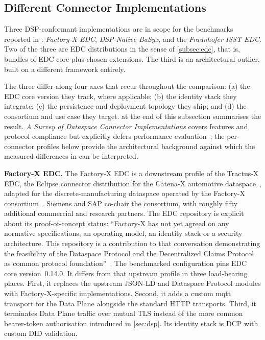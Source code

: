 \subsection{Different Connector Implementations}\label{subsec:different-connectors}

Three DSP-conformant implementations are in scope for the benchmarks reported in : \emph{Factory-X EDC}, \emph{DSP-Native BaSyx}, and the \emph{Fraunhofer ISST EDC}. Two of the three are EDC distributions in the sense of \cref{subsec:edc}, that is, bundles of EDC core plus chosen extensions. The third is an architectural outlier, built on a different framework entirely.

The three differ along four axes that recur throughout the comparison: (a) the EDC core version they track, where applicable; (b) the identity stack they integrate; (c) the persistence and deployment topology they ship; and (d) the consortium and use case they target.  at the end of this subsection summarises the result. \emph{A Survey of Dataspace Connector Implementations} covers features and protocol compliance but explicitly defers performance evaluation~\citep{dam2024surveydataspaceconnectorimplementations}; the per-connector profiles below provide the architectural background against which the measured differences in  can be interpreted.

\textbf{Factory-X EDC.} The Factory-X EDC is a downstream profile of the Tractus-X EDC, the Eclipse connector distribution for the Catena-X automotive dataspace~\citep{tractusxEdc}, adapted for the discrete-manufacturing dataspace operated by the Factory-X consortium~\citep{factoryxEdc, factoryxConsortium}. Siemens and SAP co-chair the consortium, with roughly fifty additional commercial and research partners. The EDC repository is explicit about its proof-of-concept status: ``Factory-X has not yet agreed on any normative specifications, an operating model, an identity stack or a security architecture. This repository is a contribution to that conversation demonstrating the feasibility of the Dataspace Protocol and the Decentralized Claims Protocol as common protocol foundation''~\citep{factoryxEdc}. The benchmarked configuration pins EDC core version~0.14.0. It differs from that upstream profile in three load-bearing places. First, it replaces the upstream JSON-LD and Dataspace Protocol modules with Factory-X-specific implementations. Second, it adds a custom \gls{mqtt} transport for the Data Plane alongside the standard HTTP transports. Third, it terminates Data Plane traffic over mutual TLS instead of the more common bearer-token authorisation introduced in \cref{sec:dsp}. Its identity stack is DCP with custom DID validation.

